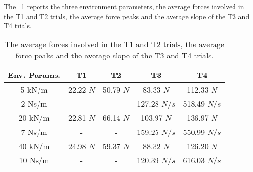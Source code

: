 \par The \tablename \ \ref{tab:meanForcesRendering} reports the three environment parameters, the average forces involved in the T1 and T2 trials, the average force peaks and the average slope of the T3 and T4 trials.
\begin{table}[]
	\renewcommand{\arraystretch}{1.3}
	\caption{The average forces involved in the T1 and T2 trials, the average force peaks and the average slope of the T3 and T4 trials.}
	\label{tab:meanForcesRendering}
	\centering
	\begin{tabular}{c c c c c}
		\hline \hline
		\bfseries Env. Params. & \bfseries T1 & \bfseries T2 & \bfseries T3 & \bfseries T4 \\
		\hline
		5 kN/m  &  22.22 $N$ & 50.79 $N$ & 83.33 $N$ & 112.33 $N$\\ 2 Ns/m & - & - & 127.28 $N/s$ & 518.49 $N/s$\\ 
		\hline
		20 kN/m &  22.81 $N$ & 66.14 $N$ & 103.97 $N$ & 136.97 $N$\\ 7 Ns/m & - & - & 159.25 $N/s$ & 550.99 $N/s$\\
		\hline
		40 kN/m  &  24.98 $N$ & 59.37 $N$ & 88.32 $N$ & 126.20 $N$\\ 10 Ns/m & - & - & 120.39 $N/s$ & 616.03 $N/s$\\
		\hline \hline
	\end{tabular}
\end{table}

